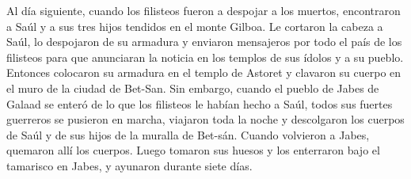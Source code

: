  Al día siguiente, cuando los filisteos fueron a despojar
a los muertos, encontraron a Saúl y a sus tres hijos tendidos en el
monte Gilboa.  Le cortaron la cabeza a Saúl, lo despojaron
de su armadura y enviaron mensajeros por todo el país de los filisteos
para que anunciaran la noticia en los templos de sus ídolos y a su
pueblo.  Entonces colocaron su armadura en el templo de
Astoret y clavaron su cuerpo en el muro de la ciudad de Bet-San.
 Sin embargo, cuando el pueblo de Jabes de Galaad se
enteró de lo que los filisteos le habían hecho a Saúl, 
todos sus fuertes guerreros se pusieron en marcha, viajaron toda la
noche y descolgaron los cuerpos de Saúl y de sus hijos de la muralla de
Bet-sán. Cuando volvieron a Jabes, quemaron allí los cuerpos.
 Luego tomaron sus huesos y los enterraron bajo el
tamarisco en Jabes, y ayunaron durante siete días.
